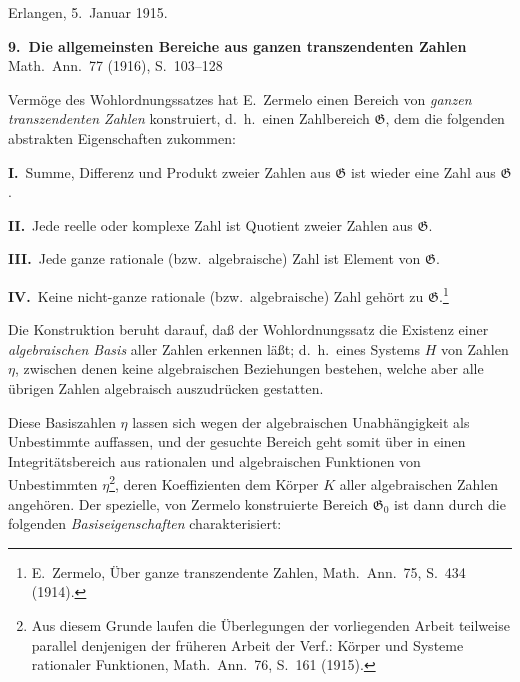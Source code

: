 \documentclass[12pt,a4paper]{article}
\begin{document}
\vspace{2em}
\begin{flushright}
Erlangen, 5.\ Januar 1915.
\end{flushright}

\newpage
\begin{center}
\textbf{9.\ Die allgemeinsten Bereiche aus ganzen transzendenten Zahlen}\\[0.5em]
\small Math.\ Ann.\ 77 (1916), S.~103--128
\end{center}

\vspace{1em}

Verm\"oge des Wohlordnungssatzes hat E.~Zermelo einen Bereich von \emph{ganzen transzendenten Zahlen} konstruiert, d.\ h.\ einen Zahlbereich $\mathfrak{G}$, dem die folgenden abstrakten Eigenschaften zukommen:

\smallskip
\textbf{I.}\ Summe, Differenz und Produkt zweier Zahlen aus $\mathfrak{G}$ ist wieder eine Zahl aus $\mathfrak{G}$.

\smallskip
\textbf{II.}\ Jede reelle oder komplexe Zahl ist Quotient zweier Zahlen aus $\mathfrak{G}$.

\smallskip
\textbf{III.}\ Jede ganze rationale (bzw.\ algebraische) Zahl ist Element von $\mathfrak{G}$.

\smallskip
\textbf{IV.}\ Keine nicht-ganze rationale (bzw.\ algebraische) Zahl geh\"ort zu $\mathfrak{G}$.\footnote{E.\ Zermelo, \"Uber ganze transzendente Zahlen, Math.\ Ann.\ 75, S.~434 (1914).}

\smallskip
Die Konstruktion beruht darauf, da\ss{} der Wohlordnungssatz die Existenz einer \emph{algebraischen Basis} aller Zahlen erkennen l\"a\ss t; d.\ h.\ eines Systems $H$ von Zahlen $\eta$, zwischen denen keine algebraischen Beziehungen bestehen, welche aber alle \"ubrigen Zahlen algebraisch auszudr\"ucken gestatten.

Diese Basiszahlen $\eta$ lassen sich wegen der algebraischen Unabh\"angigkeit als Unbestimmte auffassen, und der gesuchte Bereich geht somit \"uber in einen Integrit\"atsbereich aus rationalen und algebraischen Funktionen von Unbestimmten $\eta$\footnote{Aus diesem Grunde laufen die \"Uberlegungen der vorliegenden Arbeit teilweise parallel denjenigen der fr\"uheren Arbeit der Verf.: K\"orper und Systeme rationaler Funktionen, Math.\ Ann.\ 76, S.~161 (1915).}, deren Koeffizienten dem K\"orper $K$ aller algebraischen Zahlen angeh\"oren. Der spezielle, von Zermelo konstruierte Bereich $\mathfrak{G}_0$ ist dann durch die folgenden \emph{Basiseigenschaften} charakterisiert:
\end{document}

